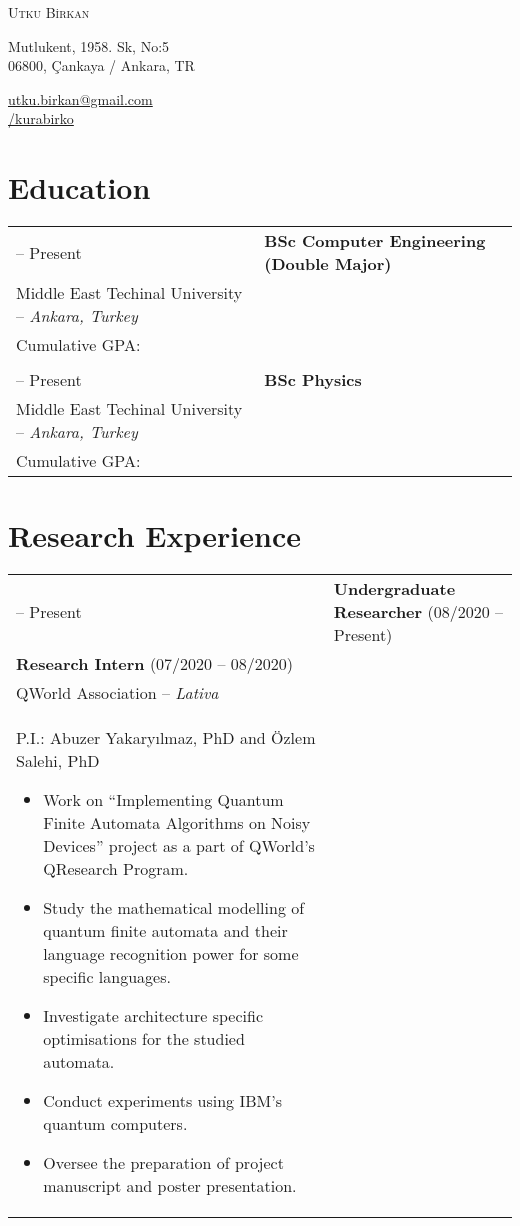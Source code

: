 \documentclass[11pt]{article} %
\makeatletter
\newlength{\firstColumnWidth}
\newlength{\tabusep}
\newlength{\slashSize}
\newcommand{\GitHub}{\raisebox{-0.22ex}{\fontsize{1.5\slashSize}{1.44\slashSize}\ttfamily\faIcon{github}}}
\newcommand{\Tr}[1]{\textturkish{#1}}
\newcommand{\tnl}{\tabularnewline & \tabularnewline}
\newcommand\liningnumbers{\addfontfeature{Numbers=Lining}}
\newenvironment{twocols}
    {
    \begin{longtable}[h]{%
        @{}%
        >{\raggedleft}p{\firstColumnWidth}%
        @{\hspace{\tabusep}}%
        >{\arraybackslash\raggedright}p{\dimexpr %
            \linewidth-\firstColumnWidth-\tabusep%
        \relax}%
        @{}%
        }
    } {
        \end{longtable}
    }
\makeatother
\begin{document}
\begin{center}
	\Tr{\LARGE \scshape {Utku Birkan}} \medskip \par
    Mutlukent, 1958. Sk, No:5 \\
    06800, Çankaya / Ankara, TR  \par
	\href{mailto:utku.birkan@gmail.com}{\ttfamily utku.birkan@gmail.com}\\
    \href{https://github.com/kurabirko}{\ttfamily {\GitHub}/kurabirko}\par
\end{center}

\section{Education}

\begin{twocols}
    2018 -- Present & %
        \textbf{BSc Computer Engineering (Double Major)} \\
        Middle East Techinal University -- \textit{Ankara, Turkey} \\
        Cumulative GPA: \liningnumbers{3.90} \tnl
    2017 -- Present & %
            \textbf{BSc Physics} \\
            Middle East Techinal University -- \textit{Ankara, Turkey} \\
            Cumulative GPA: \liningnumbers{3.50}
\end{twocols}

\section{Research Experience}

\begin{twocols}
 2020 -- Present & 
        \textbf{Undergraduate Researcher} (08\kern1pt/2020 -- Present)\\
        \textbf{Research Intern} (07\kern1pt/2020 -- 08\kern1pt/2020)\\
        QWorld Association -- \textit{Lativa}\\
        P.I.: Abuzer Yakaryılmaz, PhD and Özlem Salehi, PhD
        \begin{itemize}
            \item Work on ``Implementing Quantum Finite Automata Algorithms on Noisy Devices'' project as a part of QWorld's QResearch Program.
            \item Study the mathematical modelling of quantum finite automata and their language recognition power for some specific languages.
            \item Investigate architecture specific optimisations for the studied automata.
            \item Conduct experiments using IBM's quantum computers.
            \item Oversee the preparation of project manuscript and poster presentation.
        \end{itemize}
\end{twocols}
\end{document}
